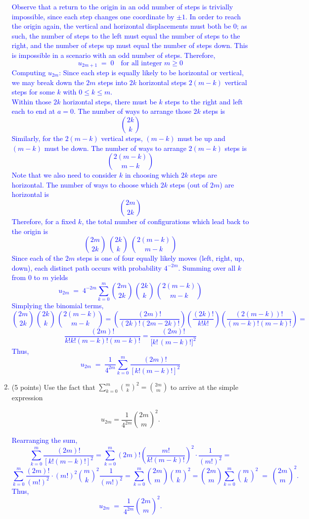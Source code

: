 \documentclass{article}
\begin{document}
\begin{enumerate}[label=(\alph*)]
\textcolor{blue}{
   Observe that a return to the origin in an odd number of steps is trivially impossible, since each step changes one coordinate by $\pm 1$. In order to reach the origin again, the vertical and horizontal displacements must both be 0; as such, the number of steps to the left must equal the number of steps to the right, and the number of steps up must equal the number of steps down. This is impossible in a scenario with an odd number of steps. Therefore,
\[
u_{2m+1} \;=\; 0 
\quad
\text{for all integer } m \ge 0
\]
Computing $u_{2m}$: Since each step is equally likely to be horizontal or vertical, we may break down the $2m$ steps into $2k$ horizontal steps $2(m-k)$ vertical steps
for some $k$ with $0 \le k \le m$. \\
Within those $2k$ horizontal steps, there must be $k$ steps to the right and left each to end at $a=0$. The number of ways to arrange those $2k$ steps is 
\[
\binom{2k}{k}
\]
Similarly, for the $2(m-k)$ vertical steps, $(m-k)$ must be up and $(m-k)$ must be down. The number of ways to arrange $2(m-k)$ steps is 
\[
\binom{2(m-k)}{m-k}
\]
Note that we also need to consider $k$ in choosing which $2k$ steps are horizontal. The number of ways to choose which $2k$ steps (out of $2m$) are horizontal is 
\[
\binom{2m}{2k}
\]
Therefore, for a fixed $k$, the total number of configurations which lead back to the origin is
\[
\binom{2m}{2k} \; \binom{2k}{k} \; \binom{2(m-k)}{m-k}
\]
Since each of the $2m$ steps is one of four equally likely moves (left, right, up, down), each distinct path occurs with probability $4^{-2m}$. Summing over all $k$ from $0$ to $m$ yields
\[
u_{2m}
\;=\;
4^{-2m}
\sum_{k=0}^{m}
\binom{2m}{2k}\,\binom{2k}{k}\,\binom{2(m-k)}{m-k}
\]
Simplying the binomial terms,
$$\binom{2m}{2k}\,\binom{2k}{k}\,\binom{2(m-k)}{m-k}=\left( \frac{(2m)!}{(2k)!(2m-2k)!}\right) \left(\frac{(2k)!}{k!k!} \right) \left( \frac{(2(m-k))!}{(m-k)!(m-k)!}\right)=$$
$$\frac{(2m)!}{k!k!(m-k)!(m-k)!}=\frac{(2m)!}{\bigl[k! \,(m-k)!\bigr]^2}
$$
Thus,
\[
u_{2m}
\;=\;
\frac{1}{4^{2m}}
\sum_{k=0}^{m}
\frac{(2m)!}{[k!(m-k)!]^2}
\]
}

\item (5 points) Use the fact that 
$\sum_{k=0}^{m} \binom{m}{k}^2 = \binom{2m}{m}$
to arrive at the simple expression

\[
u_{2m} = \frac{1}{4^{2m}} \binom{2m}{m}^2.
\]

\textcolor{blue}{
   Rearranging the sum,
$$
\sum_{k=0}^{m} \frac{(2m)!}{[k!(m-k)!]^2}
= 
\sum_{k=0}^{m} (2m)! \left(\frac{m!}{k!(m-k)!}\right)^2 \cdot \frac{1}{(m!)^2}=$$
$$
\sum_{k=0}^{m} \frac{(2m)!}{(m!)^2} \cdot (m!)^2 \binom{m}{k}^2 
\frac{1}{(m!)^2}= \sum_{k=0}^{m} \binom{2m}{m} \binom{m}{k}^2=\binom{2m}{m} \sum_{k=0}^{m} \binom{m}{k}^2
\;=\;
\binom{2m}{m}^2.
$$
Thus,
\[
u_{2m} 
\;=\;
\frac{1}{4^{2m}} \binom{2m}{m}^2.
\]}



\end{enumerate}
\end{document}
